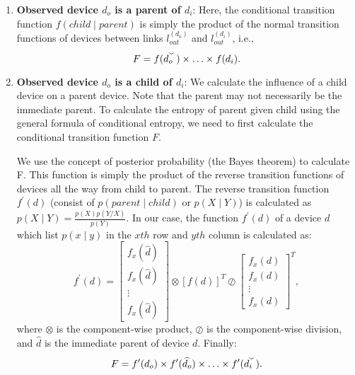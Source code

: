 \begin{enumerate}
\item \textbf{Observed device $d_o$ is a parent of $d_i$}:
Here, the conditional transition function $f(child \mid parent)$ is simply the product of the normal transition functions of devices between links $l_{out}^{(d_o)}$ and $l_{out}^{(d_i)}$, i.e.,
\[F = f(\widecheck {d_o}) \times \hdots \times f(d_i).\]

\item \textbf{Observed device $d_o$ is a child of $d_i$}:
We calculate the influence of a child device on a parent device. Note that the parent may not necessarily be the immediate parent. To calculate the entropy of parent given child using the general formula of conditional entropy, we need to first calculate the conditional transition function $F$.

We use the concept of posterior probability (the Bayes theorem) to calculate F. This function is simply the product of the reverse transition functions of devices all the way from child to parent. The reverse transition function $f^\prime(d)$ (consist of $p(parent \mid child)$ or $p(X \mid Y)$) is calculated as $p(X \mid Y) = \frac{p(X) p(Y/X)}{ p(Y)}$.  In our case, the function $f^\prime(d)$ of a device $d$ which list $p(x \mid y)$ in the $xth$ row and $yth$ column is calculated as:
\[f^\prime(d) = \left[\begin{array}{c} f_x(\widehat d)\\ f_x(\widehat d)\\ \vdots\\ f_x(\widehat d) \end{array}\right] \otimes \left[f(d)\right]^T \oslash \left[\begin{array}{c} f_x(d)\\ f_x(d)\\ \vdots\\ f_x(d) \end{array}\right]^T,\]
\noindent where $\otimes$ is the component-wise product, $\oslash$ is the component-wise division, and $\widehat d$ is the immediate parent of device $d$.
Finally:
\[F = f^\prime(d_o) \times f^\prime(\widehat {d_o}) \times \hdots \times f^\prime(\widecheck {d_i}).\]



\end{enumerate}
